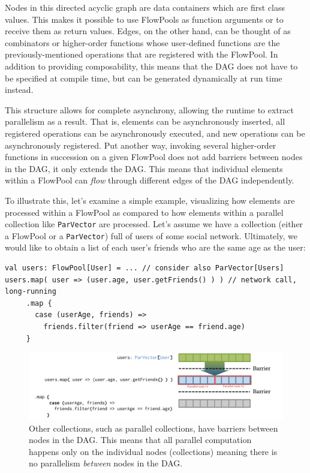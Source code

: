 Nodes in this directed acyclic graph are data containers which are first class
values. This makes it possible to use FlowPools as function arguments or to receive
them as return values. Edges, on the other hand, can be thought of as
combinators or higher-order functions whose user-defined functions are the
previously-mentioned operations that are registered with the FlowPool. In
addition to providing composability, this means that the DAG does not have to
be specified at compile time, but can be generated dynamically at run time
instead.

This structure allows for complete asynchrony, allowing the runtime to extract
parallelism as a result. That is, elements can be asynchronously inserted, all
registered operations can be asynchronously executed, and new operations can
be asynchronously registered.
Put another way, invoking several higher-order functions in succession on a given
FlowPool does not add barriers between nodes in the DAG, it only extends the DAG.
This means that individual elements within a FlowPool can \textit{flow} through
different edges of the DAG independently.

To illustrate this, let's examine a simple example, visualizing how elements are
processed within a FlowPool as compared to how elements within a parallel
collection like \verb|ParVector| are processed. Let's assume we have a
collection (either a FlowPool or a \verb|ParVector|) full of users of some
social network. Ultimately, we would like to obtain a list of each user's friends who are the same age as the user:

\begin{verbatim}
val users: FlowPool[User] = ... // consider also ParVector[Users]
users.map( user => (user.age, user.getFriends() ) ) // network call, long-running
     .map {
       case (userAge, friends) =>
         friends.filter(friend => userAge == friend.age)
     }
\end{verbatim}

\begin{figure}[!t]
\centering
\includegraphics[width=\textwidth]{images/barriers}
\caption{Other collections, such as parallel collections, have barriers between
nodes in the DAG. This means that all parallel computation happens only on the
individual nodes (collections) meaning there is no parallelism {\em between}
nodes in the DAG.}
\label{fig:barriers}
\end{figure}

